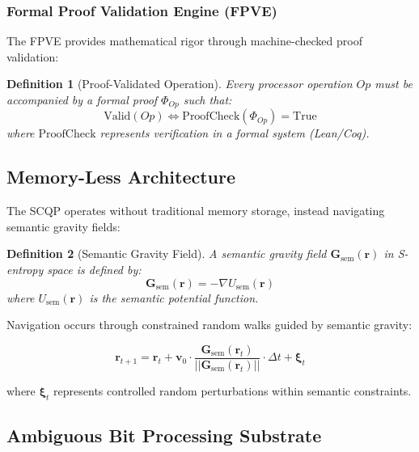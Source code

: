 \documentclass[12pt,a4paper]{article}
\newtheorem{definition}{Definition}
\begin{document}
\subsubsection{Formal Proof Validation Engine (FPVE)}

The FPVE provides mathematical rigor through machine-checked proof validation:

\begin{definition}[Proof-Validated Operation]
Every processor operation $Op$ must be accompanied by a formal proof $\Phi_{Op}$ such that:
\begin{equation}
\text{Valid}(Op) \iff \text{ProofCheck}(\Phi_{Op}) = \text{True}
\end{equation}
where $\text{ProofCheck}$ represents verification in a formal system (Lean/Coq).
\end{definition}

\subsection{Memory-Less Architecture}

The SCQP operates without traditional memory storage, instead navigating semantic gravity fields:

\begin{definition}[Semantic Gravity Field]
A semantic gravity field $\mathbf{G}_{\text{sem}}(\mathbf{r})$ in S-entropy space is defined by:
\begin{equation}
\mathbf{G}_{\text{sem}}(\mathbf{r}) = -\nabla U_{\text{sem}}(\mathbf{r})
\end{equation}
where $U_{\text{sem}}(\mathbf{r})$ is the semantic potential function.
\end{definition}

Navigation occurs through constrained random walks guided by semantic gravity:

\begin{equation}
\mathbf{r}_{t+1} = \mathbf{r}_t + \mathbf{v}_0 \cdot \frac{\mathbf{G}_{\text{sem}}(\mathbf{r}_t)}{||\mathbf{G}_{\text{sem}}(\mathbf{r}_t)||} \cdot \Delta t + \boldsymbol{\xi}_t
\end{equation}

where $\boldsymbol{\xi}_t$ represents controlled random perturbations within semantic constraints.

\subsection{Ambiguous Bit Processing Substrate}
\end{document}
